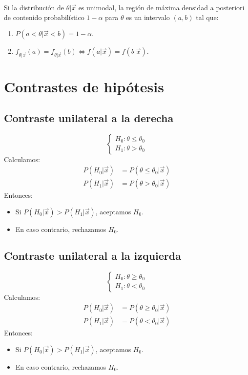 \begin{note}
    Si la distribución de $\theta|\vec{x}$ es unimodal, la región de máxima densidad a posteriori de contenido probabilístico $1-\alpha$ para $\theta$ es un intervalo $(a, b)$ tal que:
    \begin{enumerate}
        \item $P(a < \theta|\vec{x} < b) = 1-\alpha$.
        \item $f_{\theta|\vec{x}}(a) = f_{\theta|\vec{x}}(b) \Leftrightarrow f(a|\vec{x}) = f(b|\vec{x})$.
    \end{enumerate}
\end{note}

\section{Contrastes de hipótesis}
\subsection*{Contraste unilateral a la derecha}
$$\begin{cases}
        H_0: \theta \leq \theta_0 \\
        H_1: \theta > \theta_0
    \end{cases}$$
Calculamos:
\begin{align*}
    P(H_0|\vec{x}) & = P(\theta \leq \theta_0|\vec{x}) \\
    P(H_1|\vec{x}) & = P(\theta > \theta_0|\vec{x})
\end{align*}
Entonces:
\begin{itemize}
    \item Si $P(H_0|\vec{x}) > P(H_1|\vec{x})$, aceptamos $H_0$.
    \item En caso contrario, rechazamos $H_0$.
\end{itemize}

\subsection*{Contraste unilateral a la izquierda}
$$\begin{cases}
        H_0: \theta \geq \theta_0 \\
        H_1: \theta < \theta_0
    \end{cases}$$
Calculamos:
\begin{align*}
    P(H_0|\vec{x}) & = P(\theta \geq \theta_0|\vec{x}) \\
    P(H_1|\vec{x}) & = P(\theta < \theta_0|\vec{x})
\end{align*}
Entonces:
\begin{itemize}
    \item Si $P(H_0|\vec{x}) > P(H_1|\vec{x})$, aceptamos $H_0$.
    \item En caso contrario, rechazamos $H_0$.
\end{itemize}

